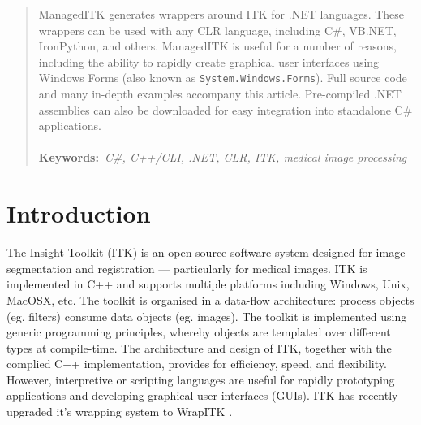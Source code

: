 \documentclass{InsightArticle}
\newcommand{\keywords}[1]{\noindent\textbf{Keywords:}\it{\ #1}}
\def\code#1{\texttt{#1}}
\begin{document}
\begin{abstract}
\noindent
ManagedITK generates wrappers around ITK for .NET languages.
These wrappers can be used with any CLR language, 
including C\#, VB.NET, IronPython, and others.
ManagedITK is useful for a number of reasons,
including the ability to rapidly create graphical user interfaces
using Windows Forms (also known as \code{System.Windows.Forms}).
Full source code and many in-depth examples accompany this article.
Pre-compiled .NET assemblies can also be downloaded for easy
integration into standalone C\# applications.
\\
\\
\keywords{C\#, C++/CLI, .NET, CLR, ITK, medical image processing}

\end{abstract}


\section{Introduction}

The Insight Toolkit (ITK) \cite{Yoo2002a} is an open-source software system 
designed for image segmentation and registration --- particularly for medical images.
ITK is implemented in C++ and supports multiple platforms including
Windows, Unix, MacOSX, etc. The toolkit is organised in a data-flow architecture:
process objects (eg. filters) consume data objects (eg. images).
The toolkit is implemented using generic programming principles, whereby
objects are templated over different types at compile-time. 
%
The architecture and design of ITK, together with the complied C++ implementation,
provides for efficiency, speed, and flexibility.
However, interpretive or scripting languages are useful for rapidly prototyping 
applications and developing graphical user interfaces (GUIs).
ITK has recently upgraded it's wrapping system to WrapITK \cite{WrapITK}.
\end{document}
